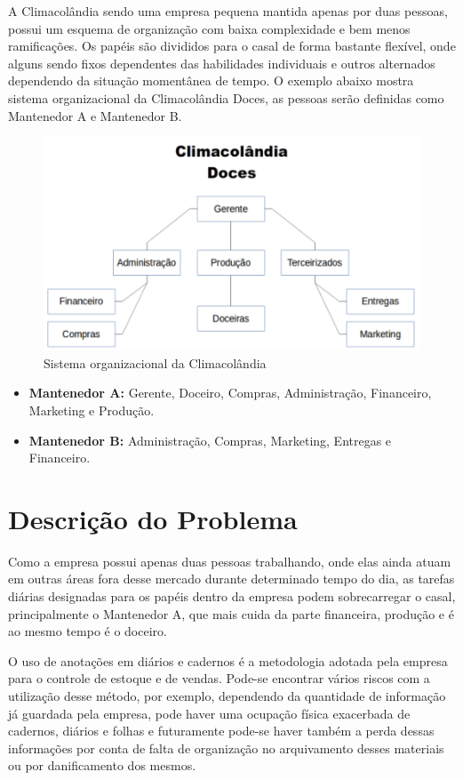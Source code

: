 A Climacolândia sendo uma empresa pequena mantida apenas por duas pessoas, possui um esquema de organização com baixa complexidade e bem menos ramificações. Os papéis são divididos para o casal de forma bastante flexível, onde alguns sendo fixos dependentes das habilidades individuais e outros alternados dependendo da situação momentânea de tempo. O exemplo abaixo mostra sistema organizacional da Climacolândia Doces, as pessoas serão definidas como Mantenedor A e Mantenedor B.

\begin{figure}[h!]
	\centering
	\includegraphics[scale=0.7]{figuras/climacolandia.png}
	\caption{Sistema organizacional da Climacolândia}
\end{figure}

\begin{itemize}
\item \textbf{Mantenedor A:} Gerente, Doceiro, Compras, Administração, Financeiro, Marketing e Produção.
\item \textbf{Mantenedor B:} Administração, Compras, Marketing, Entregas e Financeiro.
\end{itemize}

\section{Descrição do Problema}

Como a empresa possui apenas duas pessoas trabalhando, onde elas ainda atuam em outras áreas fora desse mercado durante determinado tempo do dia, as tarefas diárias designadas para os papéis dentro da empresa podem sobrecarregar o casal, principalmente o Mantenedor A, que mais cuida da parte financeira, produção e é ao mesmo tempo é o doceiro.

O uso de anotações em diários e cadernos é a metodologia adotada pela empresa para o controle de estoque e de vendas. Pode-se encontrar vários riscos com a utilização desse método, por exemplo, dependendo da quantidade de informação já guardada pela empresa, pode haver uma ocupação física exacerbada de cadernos, diários e folhas e futuramente pode-se haver também a perda dessas informações por conta de falta de organização no arquivamento desses materiais ou por danificamento dos mesmos.


